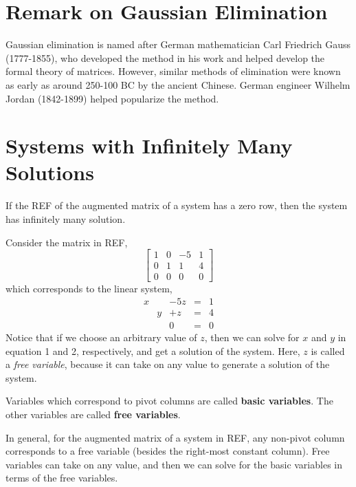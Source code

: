 \documentclass[letterpaper,12pt]{article}
\begin{document}
\section*{Remark on Gaussian Elimination}
Gaussian elimination is named after German mathematician Carl Friedrich Gauss (1777-1855), who developed the method in his work and helped develop the formal theory of matrices. However, similar methods of elimination were known as early as around 250-100 BC by the ancient Chinese. German engineer Wilhelm Jordan (1842-1899) helped popularize the method.

\section*{Systems with Infinitely Many Solutions}
If the REF of the augmented matrix of a system has a zero row, then the system has infinitely many solution.

\begin{example}
Consider the matrix in REF,
\begin{equation*}
    \begin{bmatrix}
    1 & 0 & -5 & 1 \\
    0 & 1 & 1 & 4 \\
    0 & 0 & 0 & 0
    \end{bmatrix}
\end{equation*}
which corresponds to the linear system,
\begin{equation*}
    \begin{array}{rrrrr}
        x & & -5z & = & 1 \\
        & y & + z & = & 4 \\
        & & 0 & = & 0
    \end{array}
\end{equation*}
Notice that if we choose an arbitrary value of $z$, then we can solve for $x$ and $y$ in equation 1 and 2, respectively, and get a solution of the system. Here, $z$ is called a \textit{free variable}, because it can take on any value to generate a solution of the system.
\end{example}

\begin{definition}
Variables which correspond to pivot columns are called \textbf{basic variables}. The other variables are called \textbf{free variables}.
\end{definition}

In general, for the augmented matrix of a system in REF, any non-pivot column corresponds to a free variable  (besides the right-most constant column). Free variables can take on any value, and then we can solve for the basic variables in terms of the free variables.
\end{document}
